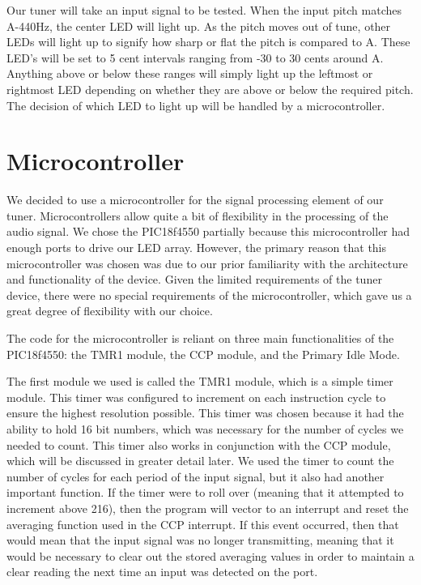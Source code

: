\documentclass[12pt]{article}
\begin{document}
Our tuner will take an input signal to be tested. When the input pitch matches A-440Hz, the
center LED will light up. As the pitch moves out of tune, other LEDs will light up to signify how sharp or
flat the pitch is compared to A. These LED's will be set to 5 cent intervals ranging from -30 to 30 cents
around A. Anything above or below these ranges will simply light up the leftmost or rightmost LED
depending on whether they are above or below the required pitch. The decision of which LED to light up
will be handled by a microcontroller.



\section{Microcontroller}
We decided to use a microcontroller for the signal processing element of our tuner. Microcontrollers
allow quite a bit of flexibility in the processing of the audio signal. We chose the PIC18f4550 partially
because this microcontroller had enough ports to drive our LED array. However, the primary reason
that this microcontroller was chosen was due to our prior familiarity with the architecture and
functionality of the device. Given the limited requirements of the tuner device, there were no special
requirements of the microcontroller, which gave us a great degree of flexibility with our choice.

The code for the microcontroller is reliant on three main functionalities of the PIC18f4550: the TMR1
module, the CCP module, and the Primary Idle Mode.

The first module we used is called the TMR1 module, which is a simple timer module. This timer was
configured to increment on each instruction cycle to ensure the highest resolution possible. This timer
was chosen because it had the ability to hold 16 bit numbers, which was necessary for the number of
cycles we needed to count. This timer also works in conjunction with the CCP module, which will be
discussed in greater detail later. We used the timer to count the number of cycles for each period of the
input signal, but it also had another important function. If the timer were to roll over (meaning that it
attempted to increment above 216), then the program will vector to an interrupt and reset the averaging
function used in the CCP interrupt. If this event occurred, then that would mean that the input signal
was no longer transmitting, meaning that it would be necessary to clear out the stored averaging values
in order to maintain a clear reading the next time an input was detected on the port.
\end{document}
